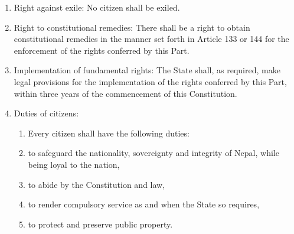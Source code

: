 \begin{questions}
\begin{solution}
\begin{enumerate}
\item Right against exile: No citizen shall be exiled.
\item Right to constitutional remedies: There shall be a right to obtain constitutional remedies in the manner set forth in Article 133 or 144 for the enforcement of the rights conferred by this Part.
\item Implementation of fundamental rights: The State shall, as required, make legal provisions for the implementation of the rights conferred by this Part, within three years of the commencement of this Constitution.
\item Duties of citizens:
\begin{enumerate}
    \item[] Every citizen shall have the following duties:
    \item to safeguard the nationality, sovereignty and integrity of Nepal, while being loyal to the nation,
    \item to abide by the Constitution and law,
    \item to render compulsory service as and when the State so requires,
    \item to protect and preserve public property.
\end{enumerate}
\end{enumerate}
  \end{solution}

\end{questions}
